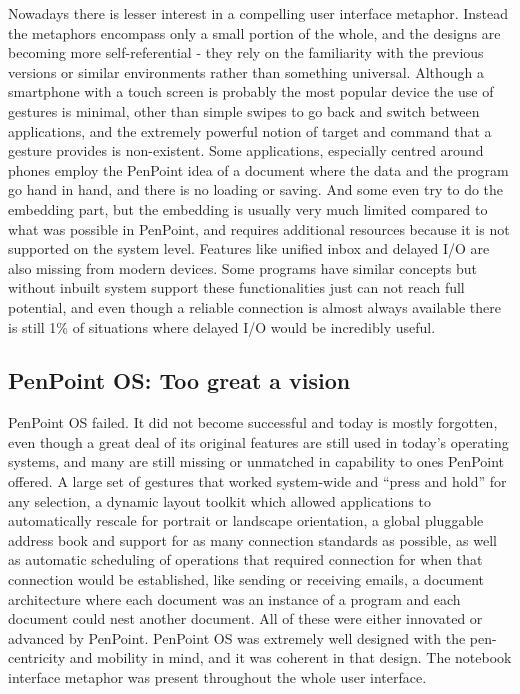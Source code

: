 Nowadays there is lesser interest in a compelling user interface metaphor.
Instead the metaphors encompass only a small portion of the whole, and the
designs are becoming more self-referential - they rely on the familiarity with
the previous versions or similar environments rather than something universal.
Although a smartphone with a touch screen is probably the most popular device
the use of gestures is minimal, other than simple swipes to go back and switch
between applications, and the extremely powerful notion of target and command
that a gesture provides is non-existent. Some applications, especially centred
around phones employ the PenPoint idea of a document where the data and the
program go hand in hand, and there is no loading or saving. And some even try
to do the embedding part, but the embedding is usually very much limited
compared to what was possible in PenPoint, and requires additional resources
because it is not supported on the system level. Features like unified inbox
and delayed I/O are also missing from modern devices. Some programs have
similar concepts but without inbuilt system support these functionalities just
can not reach full potential, and even though a reliable connection is almost
always available there is still 1\% of situations where delayed I/O would be
incredibly useful.

\subsection{PenPoint OS: Too great a vision}

PenPoint OS failed. It did not become successful and today is mostly forgotten,
even though a great deal of its original features are still used in today's
operating systems, and many are still missing or unmatched in capability to
ones PenPoint offered. A large set of gestures that worked system-wide and
``press and hold'' for any selection, a dynamic layout toolkit which allowed
applications to automatically rescale for portrait or landscape orientation,
a global pluggable address book and support for as many connection standards as
possible, as well as automatic scheduling of operations that required
connection for when that connection would be established, like sending or
receiving emails, a document architecture where each document was an instance
of a program and each document could nest another document. All of these were
either innovated or advanced by PenPoint. PenPoint OS was extremely well
designed with the pen-centricity and mobility in mind, and it was coherent in
that design. The notebook interface metaphor was present throughout the whole
user interface.

